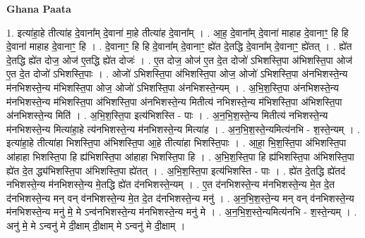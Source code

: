 \documentclass[17pt]{extarticle}
\begin{document}
\textbf{Ghana Paata } \newline

1. इत्या॑हा॒हे तीत्या॑ह दे॒वाना᳚म् दे॒वाना॑ मा॒हे तीत्या॑ह दे॒वाना᳚म् । . आ॒ह॒ दे॒वाना᳚म् दे॒वाना॑ माहाह दे॒वानाꣳ॒॒ हि हि दे॒वाना॑ माहाह दे॒वानाꣳ॒॒ हि । . दे॒वानाꣳ॒॒ हि हि दे॒वाना᳚म् दे॒वानाꣳ॒॒ ह्ये॑त दे॒तद्धि दे॒वाना᳚म् दे॒वानाꣳ॒॒ ह्ये॑तत् । . ह्ये॑त दे॒तद्धि ह्ये॑त दोज॒ ओज॑ ए॒तद्धि ह्ये॑त दोजः॑ । . ए॒त दोज॒ ओज॑ ए॒त दे॒त दोजो॑ ऽभिशस्ति॒पा अ॑भिशस्ति॒पा ओज॑ ए॒त दे॒त दोजो॑ ऽभिशस्ति॒पाः । . ओजो॑ ऽभिशस्ति॒पा अ॑भिशस्ति॒पा ओज॒ ओजो॑ ऽभिशस्ति॒पा अ॑नभिशस्ते॒न्य म॑नभिशस्ते॒न्य म॑भिशस्ति॒पा ओज॒ ओजो॑ ऽभिशस्ति॒पा अ॑नभिशस्ते॒न्यम् । . अ॒भि॒श॒स्ति॒पा अ॑नभिशस्ते॒न्य म॑नभिशस्ते॒न्य म॑भिशस्ति॒पा अ॑भिशस्ति॒पा अ॑नभिशस्ते॒न्य मितीत्य॑ नभिशस्ते॒न्य म॑भिशस्ति॒पा अ॑भिशस्ति॒पा अ॑नभिशस्ते॒न्य मिति॑ । . अ॒भि॒श॒स्ति॒पा इत्य॑भिशस्ति - पाः । . अ॒न॒भि॒श॒स्ते॒न्य मितीत्य॑ नभिशस्ते॒न्य म॑नभिशस्ते॒न्य मित्या॑हा॒हे त्य॑नभिशस्ते॒न्य म॑नभिशस्ते॒न्य मित्या॑ह । . अ॒न॒भि॒श॒स्ते॒न्यमित्य॑नभि - श॒स्ते॒न्यम् । . इत्या॑हा॒हे तीत्या॑हा भिशस्ति॒पा अ॑भिशस्ति॒पा आ॒हे तीत्या॑हा भिशस्ति॒पाः । . आ॒हा॒ भि॒श॒स्ति॒पा अ॑भिशस्ति॒पा आ॑हाहा भिशस्ति॒पा हि ह्य॑भिशस्ति॒पा आ॑हाहा भिशस्ति॒पा हि । . अ॒भि॒श॒स्ति॒पा हि ह्य॑भिशस्ति॒पा अ॑भिशस्ति॒पा ह्ये॑त दे॒त द्ध्य॑भिशस्ति॒पा अ॑भिशस्ति॒पा ह्ये॑तत् । . अ॒भि॒श॒स्ति॒पा इत्य॑भिशस्ति - पाः । . ह्ये॑त दे॒तद्धि ह्ये॑तद॑ नभिशस्ते॒न्य म॑नभिशस्ते॒न्य मे॒तद्धि ह्ये॑त द॑नभिशस्ते॒न्यम् । . ए॒त द॑नभिशस्ते॒न्य म॑नभिशस्ते॒न्य मे॒त दे॒त द॑नभिशस्ते॒न्य मन् वन् व॑नभिशस्ते॒न्य मे॒त दे॒त द॑नभिशस्ते॒न्य मनु॑ । . अ॒न॒भि॒श॒स्ते॒न्य मन् वन् व॑नभिशस्ते॒न्य म॑नभिशस्ते॒न्य मनु॑ मे॒ मे ऽन्व॑नभिशस्ते॒न्य म॑नभिशस्ते॒न्य मनु॑ मे । . अ॒न॒भि॒श॒स्ते॒न्यमित्य॑नभि - श॒स्ते॒न्यम् । . अनु॑ मे॒ मे ऽन्वनु॑ मे दी॒क्षाम् दी॒क्षाम् मे ऽन्वनु॑ मे दी॒क्षाम् । \newline
\end{document}
